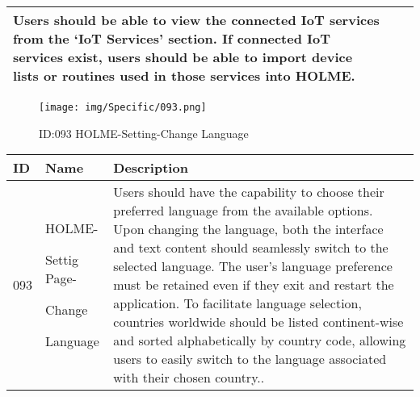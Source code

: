 \documentclass[conference]{IEEEtran}
\begin{document}
\begin{enumerate}
\begin{table}[h]
\begin{tabular}{|p{1cm}|p{1.8cm}|p{5.0cm}|}
       Users should be able to view the connected IoT services from the `IoT Services' section. 
If connected IoT services exist, users should be able to import device lists or routines used in those services into HOLME.
         \\ \hline
    \end{tabular}
\end{table}
\begin{figure}[h]
\centering                                         
\texttt{[image: img/Specific/093.png]}
\caption{ID:093 HOLME-Setting-Change Language}
\end{figure}
\begin{table}[h]
\def\arraystretch{1.2} \small
    \begin{tabular}{|p{1cm}|p{1.8cm}|p{5.0cm}|}
        \hline
        ID & Name & Description\\ \hline
         093 \par  & HOLME-\par Settig Page- \par Change \par Language&Users should have the capability to choose their preferred language from the available options. Upon changing the language, both the interface and text content should seamlessly switch to the selected language. The user's language preference must be retained even if they exit and restart the application. To facilitate language selection, countries worldwide should be listed continent-wise and sorted alphabetically by country code, allowing users to easily switch to the language associated with their chosen country..
         \\ \hline
    \end{tabular}
\end{table}
\clearpage


\end{enumerate}
\end{document}

